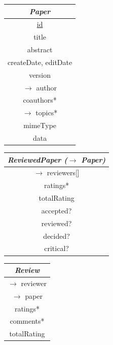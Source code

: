\documentclass[headexclude,footexclude,12pt,BCOR0pt,DIV15]{scrartcl}
\begin{document}
\begin{center}
    \begin{tabular}{|c|}
      \hline
      \emph{Paper} \\
      \hline
      \underline{id} \\
      title \\
      abstract \\
      createDate, editDate \\
      version \\
      $\longrightarrow$ author \\
      coauthors* \\
      $\longrightarrow$ topics* \\
      mimeType \\
      data \\
      \hline
    \end{tabular}
    \begin{tabular}{|c|}
      \hline
      \emph{ReviewedPaper ($\rightarrow$ Paper)} \\
      \hline
      $\longrightarrow$ reviewers[] \\
      ratings* \\
      totalRating \\
      accepted? \\
      reviewed? \\
      decided? \\
      critical? \\
      \hline
    \end{tabular}
    \begin{tabular}{|c|}
      \hline
      \emph{Review} \\
      \hline
      $\longrightarrow$ reviewer \\
      $\longrightarrow$ paper \\
      ratings* \\
      comments* \\
      totalRating \\
      \hline
    \end{tabular}


\end{center}
\end{document}
